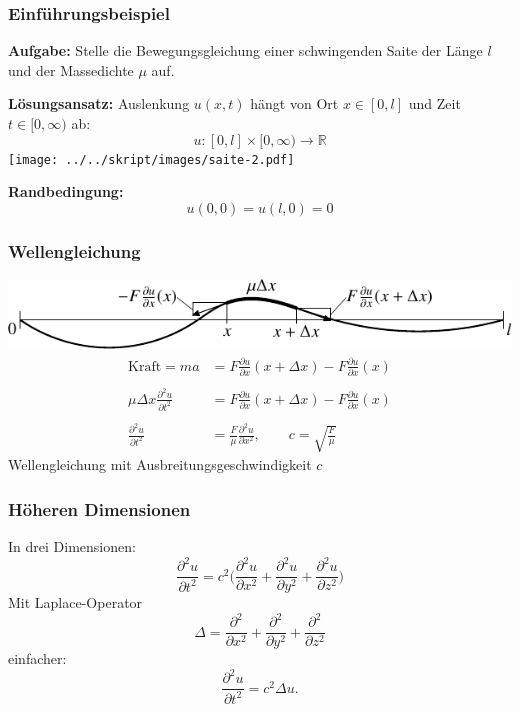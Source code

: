 \begin{frame}
\frametitle{Einführungsbeispiel}

{\bf Aufgabe:} Stelle die Bewegungsgleichung
einer schwingenden Saite der Länge $l$ und der Massedichte $\mu$ auf.

\medskip
\pause
{\bf Lösungsansatz:}
Auslenkung $ u(x,t)$ hängt von Ort $x\in[0,l]$ und Zeit $t\in[0,\infty)$
ab:
\[
u\colon [0,l]\times [0,\infty)\to \mathbb R
\]
\pause
\medskip
\texttt{[image: ../../skript/images/saite-2.pdf]}
\pause
\medskip

{\bf Randbedingung:}
\[
u(0,0)= u(l,0)=0
\]
\end{frame}


\begin{frame}
\frametitle{Wellengleichung}
\includegraphics{../../skript/images/saite-1.pdf}
\begin{align*}
\text{Kraft}
=ma
&=
F\frac{\partial u}{\partial x}(x+\Delta x)-F\frac{\partial u}{\partial x}(x)
\\
\\
\mu \Delta x \frac{\partial^2  u}{\partial t^2}
&=
F\frac{\partial u}{\partial x}(x+\Delta x)-F\frac{\partial u}{\partial x}(x)
\\
\\
\frac{\partial^2  u}{\partial t^2}
&=
\frac{F}{\mu}
\frac{\partial^2 u}{\partial x^2},
\qquad
c=\sqrt{\frac{F}{\mu}}
\end{align*}
Wellengleichung mit Ausbreitungsgeschwindigkeit $c$
\end{frame}

\begin{frame}
\frametitle{Höheren Dimensionen}
In drei Dimensionen:
\[
\frac{\partial^2 u}{\partial t^2}=c^2
\biggl(
\frac{\partial^2 u}{\partial x^2}
+
\frac{\partial^2 u}{\partial y^2}
+
\frac{\partial^2 u}{\partial z^2}
\biggr)
\]
\pause
Mit Laplace-Operator
\[
\Delta
=
\frac{\partial^2}{\partial x^2}
+
\frac{\partial^2}{\partial y^2}
+
\frac{\partial^2}{\partial z^2}
\]
\pause
einfacher:
\[
\frac{\partial^2 u}{\partial t^2}
=
c^2\Delta  u.
\]
\end{frame}


